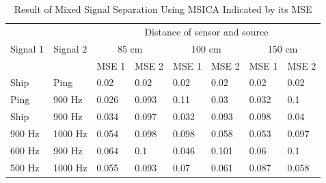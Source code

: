 \documentclass[a4paper]{jpconf}
\begin{document}
\begin{table}[hb]
\centering
\caption{Result of Mixed Signal Separation Using MSICA Indicated by its MSE}
\label{table:msemsica}
\begin{tabular}{|l|l|l|l|l|l|l|l|}
\hline
\multicolumn{1}{|c|}{\multirow{3}{*}{Signal 1}} & \multicolumn{1}{c|}{\multirow{3}{*}{Signal 2}} & \multicolumn{6}{c|}{Distance of sensor and source}                                                                                                                          \\ \cline{3-8} 
\multicolumn{1}{|c|}{}                          & \multicolumn{1}{c|}{}                          & \multicolumn{2}{c|}{85 cm}                              & \multicolumn{2}{c|}{100 cm}                             & \multicolumn{2}{c|}{150 cm}                             \\ \cline{3-8} 
\multicolumn{1}{|c|}{}                          & \multicolumn{1}{c|}{}                          & \multicolumn{1}{c|}{MSE 1} & \multicolumn{1}{c|}{MSE 2} & \multicolumn{1}{c|}{MSE 1} & \multicolumn{1}{c|}{MSE 2} & \multicolumn{1}{c|}{MSE 1} & \multicolumn{1}{c|}{MSE 2} \\ \hline
Ship                                            & Ping                                           & 0.02                       & 0.02                       & 0.02                       & 0.02                       & 0.02                       & 0.02                       \\ \hline
Ping                                            & 900 Hz                                         & 0.026                      & 0.093                      & 0.11                       & 0.03                       & 0.032                      & 0.1                        \\ \hline
Ship                                            & 900 Hz                                         & 0.034                      & 0.097                      & 0.032                      & 0.093                      & 0.098                      & 0.04                       \\ \hline
900 Hz                                          & 1000 Hz                                        & 0.054                      & 0.098                      & 0.098                      & 0.058                      & 0.053                      & 0.097                      \\ \hline
600 Hz                                          & 900 Hz                                         & 0.064                      & 0.1                        & 0.046                      & 0.101                      & 0.06                       & 0.1                        \\ \hline
500 Hz                                          & 1000 Hz                                        & 0.055                      & 0.093                      & 0.07                       & 0.061                      & 0.087                      & 0.058                      \\ \hline
\end{tabular}
\end{table}
\end{document}
